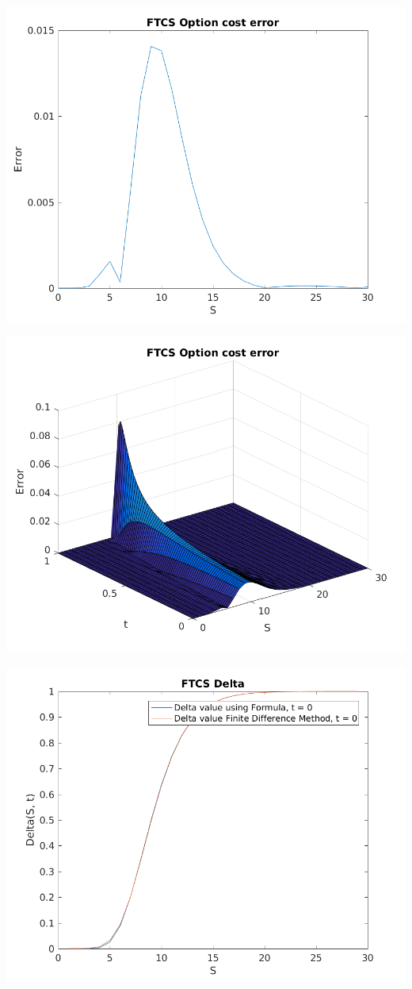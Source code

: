 \documentclass{article}
\begin{document}
\includegraphics{"q1_6"}
\pagebreak


\includegraphics{"q1_7"}
\pagebreak


\includegraphics{"q1_8"}
\pagebreak
\end{document}
